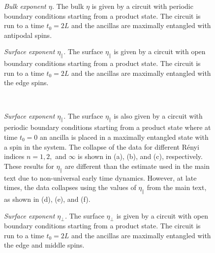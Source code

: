 \documentclass[prl,twocolumn,aps,showpacs,amsmath,amssymb,superscriptaddress,floatfix,longbibliography]{revtex4-1}
\begin{document}
\begin{figure}[htbp]
\centering
{}
\caption{\emph{Bulk exponent $\eta$.} The bulk $\eta$ is given by a circuit with periodic boundary conditions starting from a product state. The circuit is run to a time $t_0 = 2L$ and the ancillas are maximally entangled with antipodal spins.}
\label{fig:eta}
\end{figure}

\begin{figure}[htbp]
\centering
{}
\caption{\emph{Surface exponent $\eta_\parallel$.} The surface $\eta_\parallel$ is given by a circuit with open boundary conditions starting from a product state. The circuit is run to a time $t_0 = 2L$ and the ancillas are maximally entangled with the edge spins.}
\label{fig:etaPara}
\end{figure}

\begin{figure}[htbp]
\centering
{}
\\
\caption{\emph{Surface exponent $\eta_\parallel$.} The surface $\eta_\parallel$ is also given by a circuit with periodic boundary conditions starting from a product state where at time $t_0 = 0$ an ancilla is placed in a maximally entangled state with a spin in the system. The collapse of the data for different R\'enyi indices $n = 1,2,$ and $\infty$ is shown in (a), (b), and (c), respectively. These results for $\eta_\parallel$ are different than the estimate used in the main text due to non-universal early time dynamics. However, at late times, the data collapses using the values of $\eta_\parallel$ from the main text, as shown in (d), (e), and (f).}
\label{fig:etaPara2}
\end{figure}

\begin{figure}[htbp]
\centering
{}
\caption{\emph{Surface exponent $\eta_\perp$.} The surface $\eta_\perp$ is given by a circuit with open boundary conditions starting from a product state. The circuit is run to a time $t_0 = 2L$ and the ancillas are maximally entangled with the edge and middle spins.}
\label{fig:etaPerp}
\end{figure}
\end{document}
